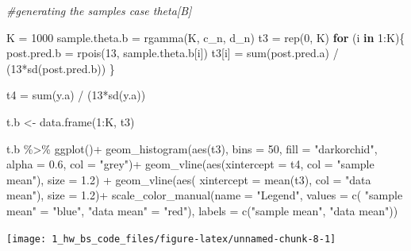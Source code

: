 \documentclass[
  11pt,
]{article}
\newenvironment{Shaded}{\begin{snugshade}}{\end{snugshade}}
\newcommand{\AttributeTok}[1]{\textcolor[rgb]{0.77,0.63,0.00}{#1}}
\newcommand{\CommentTok}[1]{\textcolor[rgb]{0.56,0.35,0.01}{\textit{#1}}}
\newcommand{\ControlFlowTok}[1]{\textcolor[rgb]{0.13,0.29,0.53}{\textbf{#1}}}
\newcommand{\DecValTok}[1]{\textcolor[rgb]{0.00,0.00,0.81}{#1}}
\newcommand{\FloatTok}[1]{\textcolor[rgb]{0.00,0.00,0.81}{#1}}
\newcommand{\FunctionTok}[1]{\textcolor[rgb]{0.00,0.00,0.00}{#1}}
\newcommand{\NormalTok}[1]{#1}
\newcommand{\OtherTok}[1]{\textcolor[rgb]{0.56,0.35,0.01}{#1}}
\newcommand{\SpecialCharTok}[1]{\textcolor[rgb]{0.00,0.00,0.00}{#1}}
\newcommand{\StringTok}[1]{\textcolor[rgb]{0.31,0.60,0.02}{#1}}
\begin{document}
\begin{Shaded}
\begin{Highlighting}[]
\CommentTok{\#generating the samples case theta[B]}

\NormalTok{K }\OtherTok{=} \DecValTok{1000}
\NormalTok{sample.theta.b }\OtherTok{=} \FunctionTok{rgamma}\NormalTok{(K, c\_n, d\_n)}
\NormalTok{t3 }\OtherTok{=} \FunctionTok{rep}\NormalTok{(}\DecValTok{0}\NormalTok{, K)}
\ControlFlowTok{for}\NormalTok{ (i }\ControlFlowTok{in} \DecValTok{1}\SpecialCharTok{:}\NormalTok{K)\{}
\NormalTok{  post.pred.b }\OtherTok{=} \FunctionTok{rpois}\NormalTok{(}\DecValTok{13}\NormalTok{, sample.theta.b[i])}
\NormalTok{  t3[i] }\OtherTok{=} \FunctionTok{sum}\NormalTok{(post.pred.a) }\SpecialCharTok{/}\NormalTok{ (}\DecValTok{13}\SpecialCharTok{*}\FunctionTok{sd}\NormalTok{(post.pred.b))}
\NormalTok{\}}

\NormalTok{t4 }\OtherTok{=}  \FunctionTok{sum}\NormalTok{(y.a) }\SpecialCharTok{/}\NormalTok{ (}\DecValTok{13}\SpecialCharTok{*}\FunctionTok{sd}\NormalTok{(y.a))}

\NormalTok{t.b }\OtherTok{\textless{}{-}} \FunctionTok{data.frame}\NormalTok{(}\DecValTok{1}\SpecialCharTok{:}\NormalTok{K, t3)}
\end{Highlighting}
\end{Shaded}

\begin{Shaded}
\begin{Highlighting}[]
\NormalTok{t.b }\SpecialCharTok{\%\textgreater{}\%} \FunctionTok{ggplot}\NormalTok{()}\SpecialCharTok{+}
  \FunctionTok{geom\_histogram}\NormalTok{(}\FunctionTok{aes}\NormalTok{(t3), }\AttributeTok{bins =} \DecValTok{50}\NormalTok{, }\AttributeTok{fill =} \StringTok{"darkorchid"}\NormalTok{, }\AttributeTok{alpha =} \FloatTok{0.6}\NormalTok{, }\AttributeTok{col =} \StringTok{"grey"}\NormalTok{)}\SpecialCharTok{+}
  \FunctionTok{geom\_vline}\NormalTok{(}\FunctionTok{aes}\NormalTok{(}\AttributeTok{xintercept =}\NormalTok{ t4, }\AttributeTok{col =} \StringTok{"sample mean"}\NormalTok{), }\AttributeTok{size =} \FloatTok{1.2}\NormalTok{) }\SpecialCharTok{+}
  \FunctionTok{geom\_vline}\NormalTok{(}\FunctionTok{aes}\NormalTok{( }\AttributeTok{xintercept =} \FunctionTok{mean}\NormalTok{(t3), }\AttributeTok{col =} \StringTok{"data mean"}\NormalTok{), }\AttributeTok{size =} \FloatTok{1.2}\NormalTok{)}\SpecialCharTok{+}
  \FunctionTok{scale\_color\_manual}\NormalTok{(}\AttributeTok{name =} \StringTok{"Legend"}\NormalTok{, }\AttributeTok{values =} \FunctionTok{c}\NormalTok{( }\StringTok{"sample mean"} \OtherTok{=} \StringTok{"blue"}\NormalTok{, }\StringTok{"data mean"} \OtherTok{=} \StringTok{"red"}\NormalTok{),}
    \AttributeTok{labels =} \FunctionTok{c}\NormalTok{(}\StringTok{"sample mean"}\NormalTok{, }\StringTok{"data mean"}\NormalTok{))}
\end{Highlighting}
\end{Shaded}

\begin{center}\texttt{[image: 1\_hw\_bs\_code\_files/figure-latex/unnamed-chunk-8-1]} \end{center}
\normalsize
\end{document}
